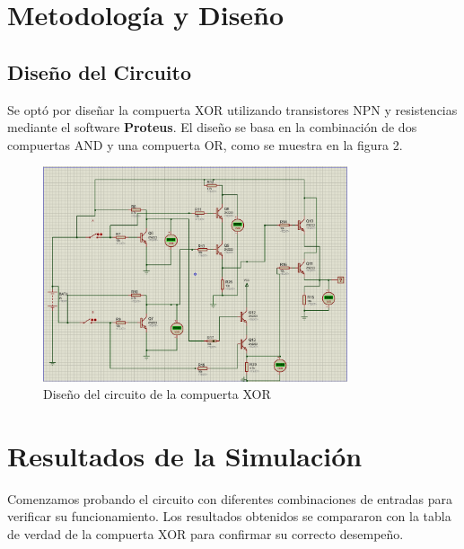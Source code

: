 \documentclass{article}
\begin{document}
\section{Metodología y Diseño}
\label{sec:diseno}
\subsection{Diseño del Circuito}
Se optó por diseñar la compuerta XOR utilizando transistores NPN y resistencias mediante el software \textbf{Proteus}. El diseño se basa en la combinación de dos compuertas AND y una compuerta OR, como se muestra en la figura 2.
\begin{figure}[H]
\centering
\includegraphics[width=0.8\textwidth]{IMG/DisenioCtoXor.png}
\caption{Diseño del circuito de la compuerta XOR}
\label{fig:diseño_circuito_xor}
\end{figure}

\section{Resultados de la Simulación}
\label{sec:resultados}
Comenzamos probando el circuito con diferentes combinaciones de entradas para verificar su funcionamiento. Los resultados obtenidos se compararon con la tabla de verdad de la compuerta XOR para confirmar su correcto desempeño.
\end{document}
